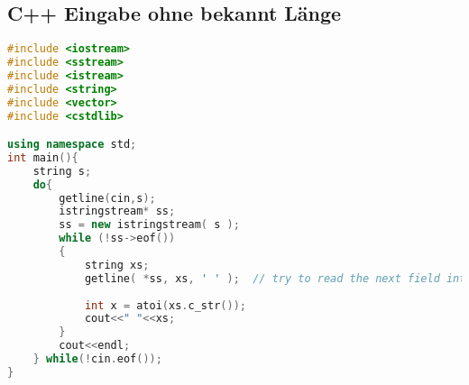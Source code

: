 \documentclass[10pt,a4paper,ngerman,oneside,
]{article}
\begin{document}
\subsection{C++ Eingabe ohne bekannt Länge}
\begin{lstlisting}[language=C++]
#include <iostream>
#include <sstream>
#include <istream>
#include <string>
#include <vector>
#include <cstdlib>

using namespace std;
int main(){
	string s;
	do{
		getline(cin,s);
		istringstream* ss;
		ss = new istringstream( s );
		while (!ss->eof())
		{
			string xs;
			getline( *ss, xs, ' ' );  // try to read the next field into it
  
			int x = atoi(xs.c_str());
			cout<<" "<<xs;
		}
		cout<<endl;	    
	} while(!cin.eof());
}
\end{lstlisting}
\end{document}
